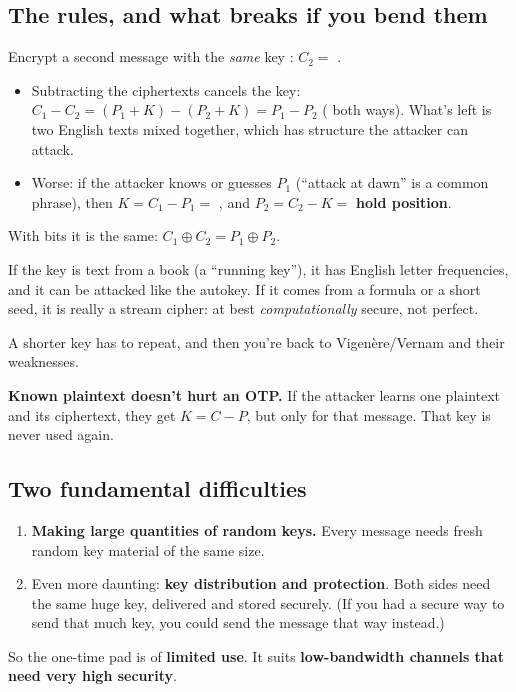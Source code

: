 \subsection{The rules, and what breaks if you bend them}
\begin{keybox}[title=Rule 1: never reuse a key (the ``two-time pad'')]
Encrypt a second message  with the \emph{same} key : $C_2 = $ .
\begin{itemize}
  \item Subtracting the ciphertexts cancels the key: $C_1 - C_2 = (P_1 + K) - (P_2 + K) = P_1 - P_2$ \;( both ways). What's left is two English texts mixed together, which has structure the attacker can attack.
  \item Worse: if the attacker knows or guesses $P_1$ (``attack at dawn'' is a common phrase), then $K = C_1 - P_1 =$ , and $P_2 = C_2 - K =$ \textbf{hold position}.
\end{itemize}
With bits it is the same: $C_1 \oplus C_2 = P_1 \oplus P_2$.
\end{keybox}
\begin{keybox}[title=Rule 2: the key must be truly random]
If the key is text from a book (a ``running key''), it has English letter frequencies, and it can be attacked like the autokey. If it comes from a formula or a short seed, it is really a stream cipher: at best \emph{computationally} secure, not perfect.
\end{keybox}
\begin{keybox}[title=Rule 3: the key must be at least as long as the message]
A shorter key has to repeat, and then you're back to Vigen\`ere/Vernam and their weaknesses.
\end{keybox}
\textbf{Known plaintext doesn't hurt an OTP.} If the attacker learns one plaintext and its ciphertext, they get $K = C - P$, but only for that message. That key is never used again.

\subsection{Two fundamental difficulties}
\begin{enumerate}[leftmargin=1.5em]
  \item \textbf{Making large quantities of random keys.} Every message needs fresh random key material of the same size.
  \item Even more daunting: \textbf{key distribution and protection}. Both sides need the same huge key, delivered and stored securely. (If you had a secure way to send that much key, you could send the message that way instead.)
\end{enumerate}
So the one-time pad is of \textbf{limited use}. It suits \textbf{low-bandwidth channels that need very high security}.

